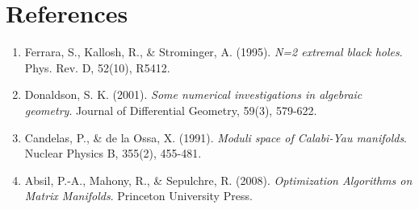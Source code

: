 \documentclass[11pt,a4paper]{article}
\begin{document}
\section*{References}
\begin{enumerate}
    \item Ferrara, S., Kallosh, R., \& Strominger, A. (1995). \textit{N=2 extremal black holes}. Phys. Rev. D, 52(10), R5412.
    \item Donaldson, S. K. (2001). \textit{Some numerical investigations in algebraic geometry}. Journal of Differential Geometry, 59(3), 579-622.
    \item Candelas, P., \& de la Ossa, X. (1991). \textit{Moduli space of Calabi-Yau manifolds}. Nuclear Physics B, 355(2), 455-481.
    \item Absil, P.-A., Mahony, R., \& Sepulchre, R. (2008). \textit{Optimization Algorithms on Matrix Manifolds}. Princeton University Press.
\end{enumerate}
\end{document}
